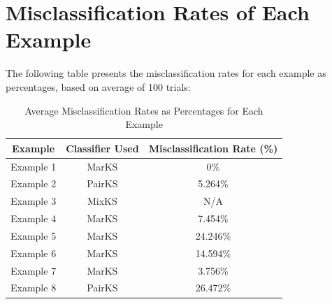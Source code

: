 \documentclass[12pt]{article}
\begin{document}
\section{Misclassification Rates of Each Example}

The following table presents the misclassification rates for each example as percentages, based on average of 100 trials:

\begin{table}[H]
    \centering
    \begin{tabular}{|c|c|c|}
        \hline
        \textbf{Example} & \textbf{Classifier Used} & \textbf{Misclassification Rate (\%)} \\
        \hline
        Example 1        & MarKS                    & 0\%                                  \\
        Example 2        & PairKS                   & 5.264\%                                \\
        Example 3        & MixKS                    & N/A                                  \\
        Example 4        & MarKS                    & 7.454\%                               \\
        Example 5        & MarKS                    & 24.246\%                               \\
        Example 6        & MarKS                    & 14.594\%                               \\
        Example 7        & MarKS                    & 3.756\%                                \\
        Example 8        & PairKS                   & 26.472\%                              \\
        \hline
    \end{tabular}
    \caption{Average Misclassification Rates as Percentages for Each Example}
\end{table}
\end{document}
